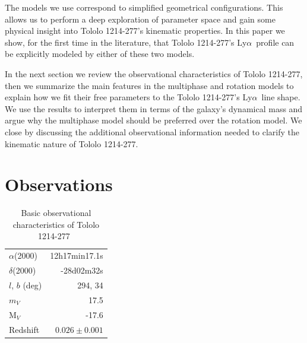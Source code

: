 \documentclass[a4,useAMS,usenatbib,usegraphicx]{mn2e}
\newcommand{\tol}{Tololo 1214-277}
\newcommand{\lya}{\ifmmode{{\rm Ly}\alpha}\else Ly$\alpha$\ \fi}
\begin{document}
The models we use correspond to simplified geometrical configurations.
This allows us to perform a deep exploration of parameter space and
gain some physical insight into \tol's kinematic properties.
In this paper we show, for the first time in the literature, that \tol's
\lya profile can be explicitly modeled by either of these two
models. 

In the next section we review the observational characteristics of
\tol, then we summarize the main features in the multiphase and
rotation models to explain how we fit their free parameters 
to the \tol's \lya line shape.
We use the results to interpret them in terms of the galaxy's
dynamical mass and argue why the multiphase model should be preferred
over the rotation model.
We close by discussing the additional observational information needed
to clarify the kinematic nature of \tol. 


\section{Observations}


\begin{table}
\begin{center}
\begin{tabular}{lr}\hline
$\alpha$(2000)& 12h17min17.1s\\
$\delta$(2000)& -28d02m32s\\
$l$, $b$ (deg) & 294, 34\\
$m_V$ & 17.5\\
  M$_V$ & -17.6\\ 
Redshift & $0.026\pm0.001$ \\\hline
\end{tabular}
\end{center}
\caption{Basic observational characteristics of \tol\ 
  \citep{Thuan97}\label{obstable}} 
\end{table}
\end{document}
